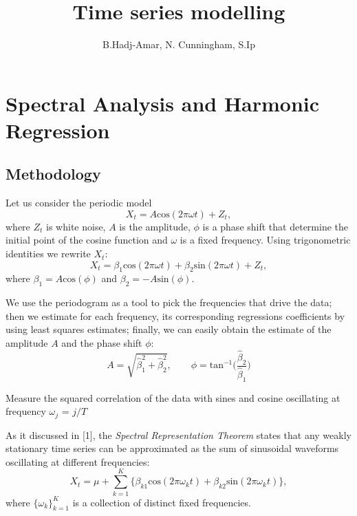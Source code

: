 \documentclass[]{article}
\title{Time series modelling}
\author{B.Hadj-Amar, N. Cunningham, S.Ip}
\begin{document}
\maketitle

\begin{abstract}

\end{abstract}

\section{Spectral Analysis and Harmonic Regression}
\subsection{Methodology}
Let us consider the periodic model
\begin{equation*}
X_t = A\text{cos}(2\pi\omega t) + Z_t,
\end{equation*} 
where $Z_t$ is white noise, $A$ is the amplitude, $\phi$ is a phase shift that determine the initial point of the cosine function and $\omega$ is a fixed frequency. 
Using trigonometric identities we rewrite $X_t$:
\begin{equation}
X_t = \beta_1\text{cos}(2\pi\omega t) + \beta_2\text{sin}(2\pi\omega t) + Z_t,
\end{equation}
where $\beta_1 = A\text{cos}(\phi)$ and $\beta_2 = -A\text{sin}(\phi)$.

We use the periodogram as a tool to pick the frequencies that drive the data; then we estimate for each frequency, its corresponding regressions coefficients by using least squares estimates; finally, we can easily obtain the estimate of the amplitude $ A$ and the phase shift $\phi$:
\begin{equation}
A = \sqrt{\hat{\beta}_1^2 + \hat{\beta}_2^2}, \qquad \phi = \text{tan}^{-1}\Big(\frac{\hat{\beta}_2}{\hat{\beta}_1}\Big)
\end{equation}

Measure the squared correlation of the data with sines and cosine oscillating at frequency $\omega_j$ = $j/T$

As it discussed in [1], the \textit{Spectral Representation Theorem} states that any weakly stationary time series can be approximated as the
sum of sinusoidal waveforms oscillating at different frequencies:
\begin{equation}
X_{t} = \mu + \sum_{k = 1}^{K} \big\{ \beta_{k 1}\text{cos}(2\pi\omega_k t) + \beta_{k 2}\text{sin}(2\pi\omega_k t) \big\},
\end{equation}
where $\{\omega_k\}_{k = 1}^{K}$ is a collection of distinct fixed frequencies.
\vspace{0.1cm}
\end{document}
